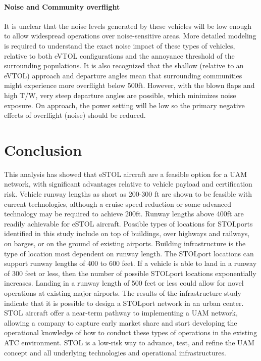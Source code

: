 \documentclass[]{aiaa-tc}%
\begin{document}
\paragraph{Noise and Community overflight} It is unclear that the noise levels generated by these vehicles will be low enough to allow widespread operations over noise-sensitive areas. More detailed modeling is required to understand the exact noise impact of these types of vehicles, relative to both eVTOL configurations and the annoyance threshold of the surrounding populations.  It is also recognized that the shallow (relative to an eVTOL) approach and departure angles mean that surrounding communities might experience more overflight below 500ft.  However, with the blown flaps and high T/W, very steep departure angles are possible, which minimizes noise exposure.  On approach, the power setting will be low so the primary negative effects of overflight (noise) should be reduced. 

\section{Conclusion}
This analysis has showed that eSTOL aircraft are a feasible option for a UAM network, with significant advantages relative to vehicle payload and certification risk.  Vehicle runway lengths as short as 200-300 ft are shown to be feasible with current technologies, although a cruise speed reduction or some advanced technology may be required to achieve 200ft.   Runway lengths above 400ft are readily achievable for eSTOL aircraft. 
Possible types of locations for STOLports identified in this study include on top of buildings, over highways and railways, on barges, or on the ground of existing airports. Building infrastructure is the type of location most dependent on runway length. The STOLport locations can support runway lengths of 400 to 600 feet. If a vehicle is able to land in a runway of 300 feet or less, then the number of possible STOLport locations exponentially increases. Landing in a runway length of 500 feet or less could allow for novel operations at existing major airports. The results of the infrastructure study indicate that it is possible to design a STOLport network in an urban center.
STOL aircraft offer a near-term pathway to implementing a UAM network, allowing a company to capture early market share and start developing the operational knowledge of how to conduct these types of operations in the existing ATC environment.  STOL is a low-risk way to advance, test, and refine the UAM concept and all underlying technologies and operational infrastructures.  


\end{document}
